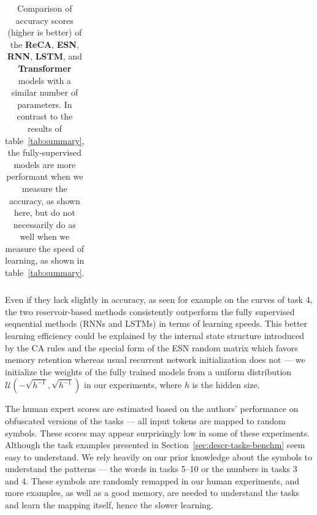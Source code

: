 \begin{table}[htbp]
\begin{tabular}{p{7cm}cccccc}
      \bottomrule
    \end{tabular}
    \caption{Comparison of accuracy scores (higher is better) of the
      \textbf{ReCA}, \textbf{ESN}, \textbf{RNN}, \textbf{LSTM}, and
      \textbf{Transformer} models with a similar number of parameters. In
      contrast to the results of table~\ref{tab:summary}, the fully-supervised
      models are more performant when we measure the accuracy, as shown here,
      but do not necessarily do as well when we measure the speed of learning,
      as shown in table~\ref{tab:summary}. }\label{tab:accuracy_all}
\end{table}

Even if they lack slightly in accuracy, as seen for example on the curves of task 4,
the two reservoir-based methods consistently outperform the fully supervised
sequential methods (RNNs and LSTMs) in terms of learning speeds. This better
learning efficiency could be explained by the internal state structure
introduced by the CA rules and the special form of the ESN random matrix which
favors memory retention whereas usual recurrent network initialization does not
--- we initialize the weights of the fully trained models from a uniform
distribution $\mathcal{U}( - \sqrt{h^{-1}} ,\sqrt{h^{-1}})$ in our experiments, where $h$
is the hidden size.

The human expert scores are estimated based on the authors' performance on
obfuscated versions of the tasks --- all input tokens are mapped to random
symbols. These scores may appear surprisingly low in some of these experiments.
Although the task examples presented in Section~\ref{sec:descr-tasks-benchm}
seem easy to understand. We rely heavily on our prior knowledge about the
symbols to understand the patterns --- the words in tasks 5--10 or the numbers in
tasks 3 and 4. These symbols are randomly remapped in our human experiments, and
more examples, as well as a good memory, are needed to understand the tasks and
learn the mapping itself, hence the slower learning.

